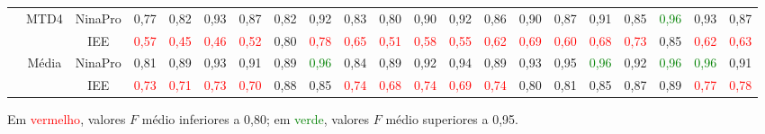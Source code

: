 \begin{sidewaystable}[htb]
{\begin{tabular}{cc|c|ccccccccccccccccc|c}
			\cline{2-21}                                                                                                                                                             
			& \multirow{2}{*}{MTD4}	& NinaPro	&0,77&	0,82&	0,93&	0,87&	0,82&	0,92&	0,83&	0,80&	0,90&	0,92&	0,86&	0,90&	0,87&	0,91&	0,85&		\textcolor{green}{0,96}&	0,93&	0,87\\
			&						& IEE		&\textcolor{red}{0,57}	&\textcolor{red}{0,45}	&\textcolor{red}{0,46}	&\textcolor{red}{0,52}	&0,80	&	\textcolor{red}{0,78}	&\textcolor{red}{0,65}	&\textcolor{red}{0,51}	&\textcolor{red}{0,58}	&\textcolor{red}{0,55}	&\textcolor{red}{0,62}			&\textcolor{red}{0,69}	&\textcolor{red}{0,60}	&\textcolor{red}{0,68}	&	\textcolor{red}{0,73}	&0,85	&\textcolor{red}{0,62}	&\textcolor{red}{0,63}\\
			\midrule
			
			&\multirow{2}{*}{Média} & NinaPro	& 0,81&	0,89&	0,93&	0,91&	0,89&	\textcolor{green}{0,96}&	0,84&	0,89&	0,92&	0,94&	0,89&	0,93&	0,95&	\textcolor{green}{0,96}&	0,92&	\textcolor{green}{0,96}&	\textcolor{green}{0,96}&	0,91\\
			&						& IEE		&	\textcolor{red}{0,73}	&	\textcolor{red}{0,71}	&	\textcolor{red}{0,73}	&	\textcolor{red}{0,70}	&0,88	&0,85	&	\textcolor{red}{0,74}	&\textcolor{red}{0,68}	&	\textcolor{red}{0,74}	&\textcolor{red}{0,69}	&	\textcolor{red}{0,74}	&0,80	&0,81	&0,85	&0,87	&0,89	&	\textcolor{red}{0,77}	&	\textcolor{red}{0,78}\\
			\bottomrule
		\end{tabular}
	}{
	Em \textcolor{red}{vermelho}, valores $F$ médio inferiores a 0,80;
	em \textcolor{green}{verde}, valores $F$ médio superiores a 0,95.
	}
\end{sidewaystable}
